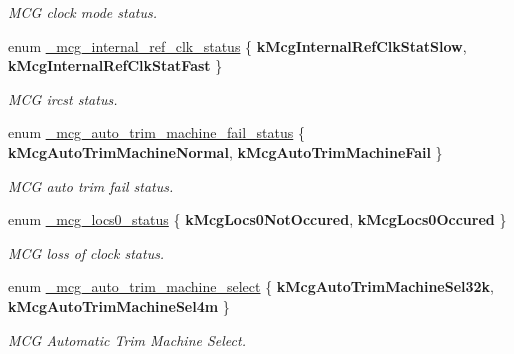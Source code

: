 \begin{DoxyCompactItemize}
\begin{DoxyCompactList}\small\item\em M\+CG clock mode status. \end{DoxyCompactList}
\item 
enum \hyperlink{group__mcg__hal_ga978a9571080887fbf525f18d23c69f16}{\+\_\+mcg\+\_\+internal\+\_\+ref\+\_\+clk\+\_\+status} \{ {\bfseries k\+Mcg\+Internal\+Ref\+Clk\+Stat\+Slow}, 
{\bfseries k\+Mcg\+Internal\+Ref\+Clk\+Stat\+Fast}
 \}\hypertarget{group__mcg__hal_ga978a9571080887fbf525f18d23c69f16}{}\label{group__mcg__hal_ga978a9571080887fbf525f18d23c69f16}
\begin{DoxyCompactList}\small\item\em M\+CG ircst status. \end{DoxyCompactList}
\item 
enum \hyperlink{group__mcg__hal_ga816f934f0e92520237f2ab53bcfe39e4}{\+\_\+mcg\+\_\+auto\+\_\+trim\+\_\+machine\+\_\+fail\+\_\+status} \{ {\bfseries k\+Mcg\+Auto\+Trim\+Machine\+Normal}, 
{\bfseries k\+Mcg\+Auto\+Trim\+Machine\+Fail}
 \}\hypertarget{group__mcg__hal_ga816f934f0e92520237f2ab53bcfe39e4}{}\label{group__mcg__hal_ga816f934f0e92520237f2ab53bcfe39e4}
\begin{DoxyCompactList}\small\item\em M\+CG auto trim fail status. \end{DoxyCompactList}
\item 
enum \hyperlink{group__mcg__hal_ga1d8cf5d61529774f2d79c950fa3a3132}{\+\_\+mcg\+\_\+locs0\+\_\+status} \{ {\bfseries k\+Mcg\+Locs0\+Not\+Occured}, 
{\bfseries k\+Mcg\+Locs0\+Occured}
 \}\hypertarget{group__mcg__hal_ga1d8cf5d61529774f2d79c950fa3a3132}{}\label{group__mcg__hal_ga1d8cf5d61529774f2d79c950fa3a3132}
\begin{DoxyCompactList}\small\item\em M\+CG loss of clock status. \end{DoxyCompactList}
\item 
enum \hyperlink{group__mcg__hal_ga290ae258db9bd644c164aa136405dac8}{\+\_\+mcg\+\_\+auto\+\_\+trim\+\_\+machine\+\_\+select} \{ {\bfseries k\+Mcg\+Auto\+Trim\+Machine\+Sel32k}, 
{\bfseries k\+Mcg\+Auto\+Trim\+Machine\+Sel4m}
 \}\hypertarget{group__mcg__hal_ga290ae258db9bd644c164aa136405dac8}{}\label{group__mcg__hal_ga290ae258db9bd644c164aa136405dac8}
\begin{DoxyCompactList}\small\item\em M\+CG Automatic Trim Machine Select. \end{DoxyCompactList}

\end{DoxyCompactItemize}
